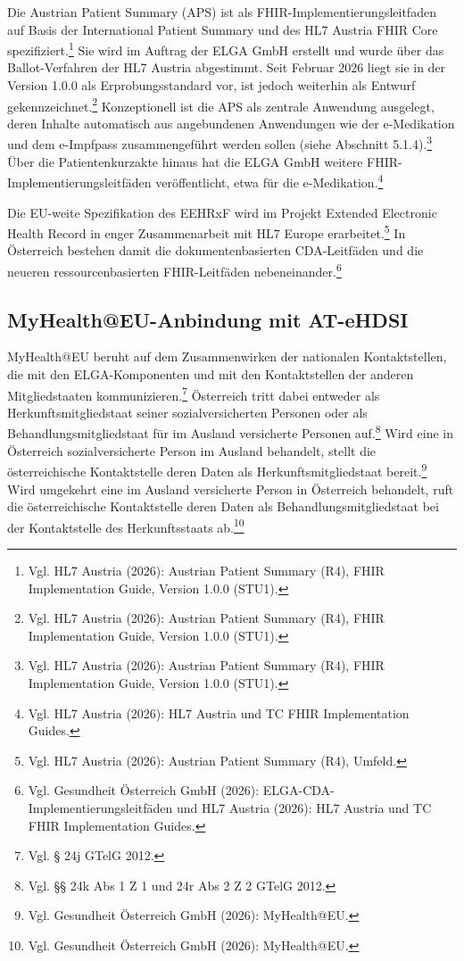 Die Austrian Patient Summary (APS) ist als FHIR-Implementierungsleitfaden auf Basis der International Patient Summary und des HL7 Austria FHIR Core spezifiziert.\footnote{Vgl. HL7 Austria (2026): Austrian Patient Summary (R4), FHIR Implementation Guide, Version 1.0.0 (STU1).} Sie wird im Auftrag der ELGA GmbH erstellt und wurde über das Ballot-Verfahren der HL7 Austria abgestimmt. Seit Februar 2026 liegt sie in der Version 1.0.0 als Erprobungsstandard vor, ist jedoch weiterhin als Entwurf gekennzeichnet.\footnote{Vgl. HL7 Austria (2026): Austrian Patient Summary (R4), FHIR Implementation Guide, Version 1.0.0 (STU1).} Konzeptionell ist die APS als zentrale Anwendung ausgelegt, deren Inhalte automatisch aus angebundenen Anwendungen wie der e-Medikation und dem e-Impfpass zusammengeführt werden sollen (siehe Abschnitt 5.1.4).\footnote{Vgl. HL7 Austria (2026): Austrian Patient Summary (R4), FHIR Implementation Guide, Version 1.0.0 (STU1).} Über die Patientenkurzakte hinaus hat die ELGA GmbH weitere FHIR-Implementierungsleitfäden veröffentlicht, etwa für die e-Medikation.\footnote{Vgl. HL7 Austria (2026): HL7 Austria und TC FHIR Implementation Guides.}

Die EU-weite Spezifikation des EEHRxF wird im Projekt Extended Electronic Health Record in enger Zusammenarbeit mit HL7 Europe erarbeitet.\footnote{Vgl. HL7 Austria (2026): Austrian Patient Summary (R4), Umfeld.} In Österreich bestehen damit die dokumentenbasierten CDA-Leitfäden und die neueren ressourcenbasierten FHIR-Leitfäden nebeneinander.\footnote{Vgl. Gesundheit Österreich GmbH (2026): ELGA-CDA-Implementierungsleitfäden und HL7 Austria (2026): HL7 Austria und TC FHIR Implementation Guides.}

    \subsection{MyHealth@EU-Anbindung mit AT-eHDSI}
MyHealth@EU beruht auf dem Zusammenwirken der nationalen Kontaktstellen, die mit den ELGA-Komponenten und mit den Kontaktstellen der anderen Mitgliedstaaten kommunizieren.\footnote{Vgl. § 24j GTelG 2012.} Österreich tritt dabei entweder als Herkunftsmitgliedstaat seiner sozialversicherten Personen oder als Behandlungsmitgliedstaat für im Ausland versicherte Personen auf.\footnote{Vgl. §§ 24k Abs 1 Z 1 und 24r Abs 2 Z 2  GTelG 2012.} Wird eine in Österreich sozialversicherte Person im Ausland behandelt, stellt die österreichische Kontaktstelle deren Daten als Herkunftsmitgliedstaat bereit.\footnote{Vgl. Gesundheit Österreich GmbH (2026): MyHealth@EU.} Wird umgekehrt eine im Ausland versicherte Person in Österreich behandelt, ruft die österreichische Kontaktstelle deren Daten als Behandlungsmitgliedstaat bei der Kontaktstelle des Herkunftsstaats ab.\footnote{Vgl. Gesundheit Österreich GmbH (2026): MyHealth@EU.}

